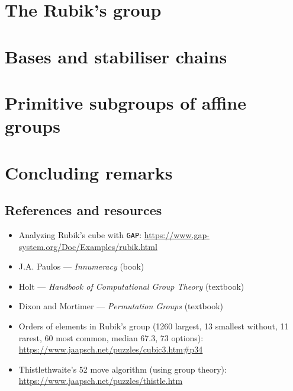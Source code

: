 \documentclass[handout]{beamer}
\begin{document}


\section{The Rubik's group}



\section{Bases and stabiliser chains}

% 

\section{Primitive subgroups of affine groups}



\section{Concluding remarks}

\subsection{References and resources}

\begin{slide}
    \begin{itemize}
        \item Analyzing Rubik's cube with \texttt{GAP}: \url{https://www.gap-system.org/Doc/Examples/rubik.html}
        \item J.A. Paulos --- \textit{Innumeracy} (book)
        \item Holt --- \textit{Handbook of Computational Group Theory} (textbook)
        \item Dixon and Mortimer --- \textit{Permutation Groups} (textbook)
        \item Orders of elements in Rubik's group (1260 largest, 13 smallest without, 11 rarest, 60 most common, median 67.3, 73 options): \url{https://www.jaapsch.net/puzzles/cubic3.htm\#p34}
        \item Thistlethwaite's 52 move algorithm (using group theory): \url{https://www.jaapsch.net/puzzles/thistle.htm}
    \end{itemize}
\end{slide}


\end{document}
